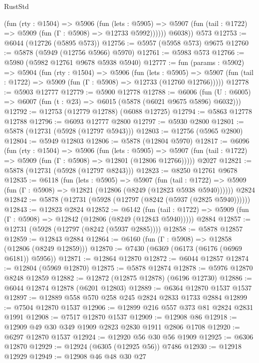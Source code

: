 \begin{lexlean}{RustStd}
\begin{coremodule}
            (fun (rty : @1504) =>
            @5906
              (fun (lets : @5905) =>
              @5907 (fun (tail : @1722) => @5909 (fun (Γ : @5908) => @12733 @5992))))))
        @6038))
    @573
@12753 := @6044 (@12726 (@5895 @573))
@12756 := @5957 (@5958 @573) @9675
@12760 := @5878 (@5949 (@12756 @5966) @5970)
@12761 := @5983 @573
@12766 := @5980 (@5982 @12761 @9678 @5938 @5940)
@12777 := fun (params : @5902) =>
  @5904
    (fun (rty : @1504) =>
    @5906
      (fun (lets : @5905) =>
      @5907 (fun (tail : @1722) => @5909 (fun (Γ : @5908) => @12733 (@12760 @12766)))))
@12778 := @5903 @12777
@12779 := @5900 @12778
@12788 := @6006
    (fun (U : @6005) => @6007 (fun (t : @23) => @6015 (@5878 (@6021 @9675 @5896) @6032)))
@12792 := @12753 (@12779 @12788) (@6088 @12725)
@12794 := @5863 @12778 @12788
@12796 := @6093 @12777 @2800
@12797 := @5930 @2800
@12801 := @5878 (@12731 (@5928 (@12797 @5943)))
@12803 := @12756 (@5965 @2800)
@12804 := @5949 @12803
@12806 := @5878 (@12804 @5970)
@12817 := @6096
    (fun (rty : @1504) =>
    @5906
      (fun (lets : @5905) =>
      @5907 (fun (tail : @1722) => @5909 (fun (Γ : @5908) => @12801 (@12806 @12766)))))
    @2027
@12821 := @5878 (@12731 (@5928 (@12797 @8243)))
@12823 := @8250 @12761 @9678
@12835 := @6118
    (fun (lets : @5905) =>
    @5907
      (fun (tail : @1722) =>
      @5909 (fun (Γ : @5908) => @12821 (@12806 (@8249 (@12823 @5938 @5940))))))
    @2824
@12842 := @5878 (@12731 (@5928 (@12797 (@8242 (@5937 (@2825 @5940))))))
@12843 := @12823 @2824
@12852 := @6142
    (fun (tail : @1722) => @5909 (fun (Γ : @5908) => @12842 (@12806 (@8249 (@12843 @5940)))))
    @2884
@12857 := @12731 (@5928 (@12797 (@8242 (@5937 @2885))))
@12858 := @5878 @12857
@12859 := @12843 @2884
@12864 := @6160 (fun (Γ : @5908) => @12858 (@12806 (@8249 @12859)))
@12870 := @7430 (@6369 (@6173 (@6176 (@6969 @6181)) @5956))
@12871 := @12864 @12870
@12872 := @6044 @12857
@12874 := @12804 (@5969 @12870)
@12875 := @5878 @12874
@12878 := @5976 @12870 @8248 @12859
@12882 := @12872 (@12875 @12878) (@6196 @12730)
@12886 := @6044 @12874 @12878 (@6201 @12803)
@12889 := @6364 @12870 @1537 @1537
@12897 := @12889 @558 @570 @258 @245 @2824 @2833 @1733 @2884
@12899 := @7504 @12870 @1537
@12906 := @12899 @216 @557 @373 @81 @2824 @2831 @1991
@12908 := @7517 @12870 @1537
@12909 := @12908 @86
@12918 := @12909 @49 @30 @349 @1909 @2823 @2830 @1911 @2806 @1708
@12920 := @6297 @12870 @1537
@12924 := @12920 @56 @30 @56 @1909
@12925 := @6306 @12870
@12929 := @12924 (@6305 (@12925 @56)) @7486
@12930 := @12918 @12929
@12949 := @12908
    @46
    @48
    @30
    @27

\end{coremodule}
\end{lexlean}
